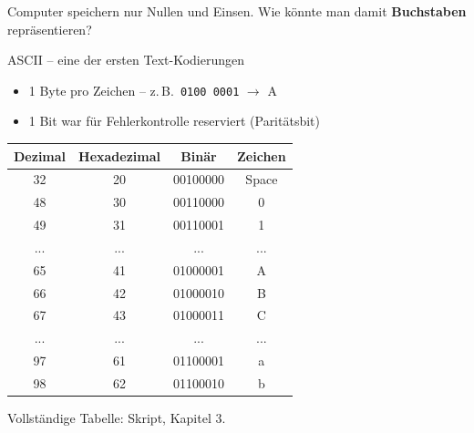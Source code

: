 \renewcommand{\thelektion}{L05 \textperiodcentered{} ASCII \& UTF-8}

\begin{frame}\end{frame}

\begin{frame}
\begin{center}
Computer speichern nur Nullen und Einsen. Wie könnte man damit \textbf{Buchstaben} repräsentieren?
\end{center}
\end{frame}

\begin{frame}
\gls{ASCII} -- eine der ersten Text-Kodierungen
\begin{itemize}\setlength\itemsep{6pt}
	\item 1 Byte pro Zeichen -- z.\,B.\ \texttt{0100 0001} $\rightarrow$ A
	\item 1 Bit war für Fehlerkontrolle reserviert (Paritätsbit)
\end{itemize}
\end{frame}

\begin{frame}[fragile]
\begin{table}[H]
	\centering
	\tiny
	\begin{tabular}{cccc}
		\toprule
		Dezimal & Hexadezimal & Binär & Zeichen \\
		\midrule
		32 & 20 & 00100000 & Space \\
		48 & 30 & 00110000 & 0 \\
		49 & 31 & 00110001 & 1 \\\midrule
		... & ... & ... & ... \\\midrule
		65 & 41 & 01000001 & A \\
		66 & 42 & 01000010 & B \\
		67 & 43 & 01000011 & C \\\midrule
		... & ... & ... & ... \\\midrule
		97 & 61 & 01100001 & a \\
		98 & 62 & 01100010 & b \\
		\bottomrule
	\end{tabular}
\end{table}
\begin{center}Vollständige Tabelle: Skript, Kapitel 3.\end{center}
\end{frame}

